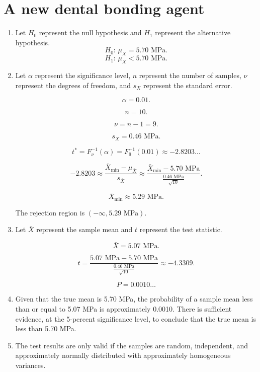 \documentclass[12pt]{article}
\begin{document}
\section{A new dental bonding agent}
\begin{enumerate}
\item Let $H_0$ represent the null hypothesis and $H_1$ represent the alternative hypothesis.
\[H_0:\,\mu_X=5.70\text{ MPa}.\]
\[H_1:\,\mu_X<5.70\text{ MPa}.\]
\item Let $\alpha$ represent the significance level, $n$ represent the number of samples, $\nu$ represent the degrees of freedom, and $s_X$ represent the standard error.

\[\alpha=0.01.\]

\[n=10.\]

\[\nu=n-1=9.\]

\[s_X=0.46\text{ MPa}.\]

\[t^*=F^{-1}_\nu(\alpha)=F^{-1}_{9}(0.01)\approx -2.8203\dots\]

\[-2.8203\approx\frac{\bar{X}_{\text{min}}-\mu_{\bar{X}}}{s_{\bar{X}}}\approx\frac{\bar{X}_{\text{min}}-5.70\text{ MPa}}{\frac{0.46\text{ MPa}}{\sqrt{10}}}.\]

\[\bar{X}_{\text{min}}\approx 5.29\text{ MPa}.\]

The rejection region is $(-\infty,5.29\text{ MPa})$.
\item Let $\bar{X}$ represent the sample mean and $t$ represent the test statistic.

\[\bar{X}=5.07\text{ MPa}.\]

\[t=\frac{5.07\text{ MPa}-5.70\text{ MPa}}{\frac{0.46\text{ MPa}}{\sqrt{10}}}\approx -4.3309.\]

\[P=0.0010\dots\]

\item Given that the true mean is 5.70 MPa, the probability of a sample mean less than or equal to 5.07 MPa is approximately 0.0010. There is sufficient evidence, at the 5-percent significance level, to conclude that the true mean is less than 5.70 MPa.

\item The test results are only valid if the samples are random, independent, and approximately normally distributed with approximately homogeneous variances.
\end{enumerate}
\end{document}
